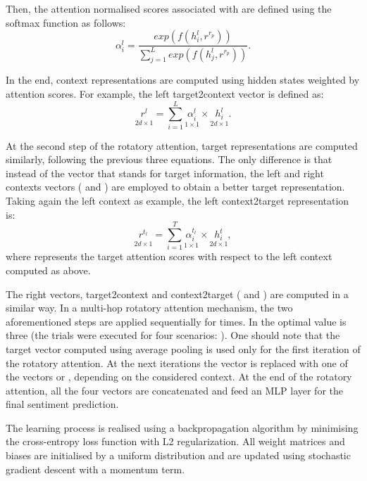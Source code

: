 \documentclass[hidelinks]{llncs}
\begin{document}
Then, the attention normalised scores  associated with  are defined using the softmax function as follows:
\begin {equation}
\label{equation2}
\alpha_i^l = \frac{exp(f(h_i^l, r^{r_p}))}{\sum_{j=1}^L exp(f(h_j^l, r^{r_p}))}.
\end {equation}

In the end, context representations are computed using hidden states weighted by attention scores. For example, the left target2context vector is defined as:
\begin {equation}
\label{equation3}
\underset{2d \times 1}{r^l_{}} = \sum_{i = 1}^{L}\underset{1 \times 1}{\alpha^l_i} \times \underset{2d \times 1}{h_i^l}.
\end {equation}

At the second step of the rotatory attention, target representations are computed similarly, following the previous three equations. The only difference is that instead of the  vector that stands for target information, the left and right contexts vectors ( and ) are employed to obtain a better target representation. Taking again the left context as example, the left context2target representation  is:
\begin {equation}
\label{equation4}
\underset{2d \times 1}{r^{t_l}_{}} = \sum_{i = 1}^{T}\underset{1 \times 1}{\alpha_i^{t_l}} \times \underset{2d \times 1}{h_i^t},
\end {equation}
where  represents the target attention scores with respect to the left context computed as above.

The right vectors, target2context and context2target ( and ) are computed in a similar way. In a multi-hop rotatory attention mechanism, the two aforementioned steps are applied sequentially for  times. In \cite{wallaart2019hybrid} the optimal  value is three (the trials were executed for four scenarios: ). One should note that the  target vector computed using average pooling is used only for the first iteration of the rotatory attention. At the next iterations the vector  is replaced with one of the vectors  or , depending on the considered context. At the end of the rotatory attention, all the four vectors are concatenated and feed an MLP layer for the final sentiment prediction. 

The learning process is realised using a backpropagation algorithm by minimising the cross-entropy loss function with L2 regularization. All weight matrices and biases are initialised by a uniform distribution and are updated using stochastic gradient descent with a momentum term. 
\end{document}
